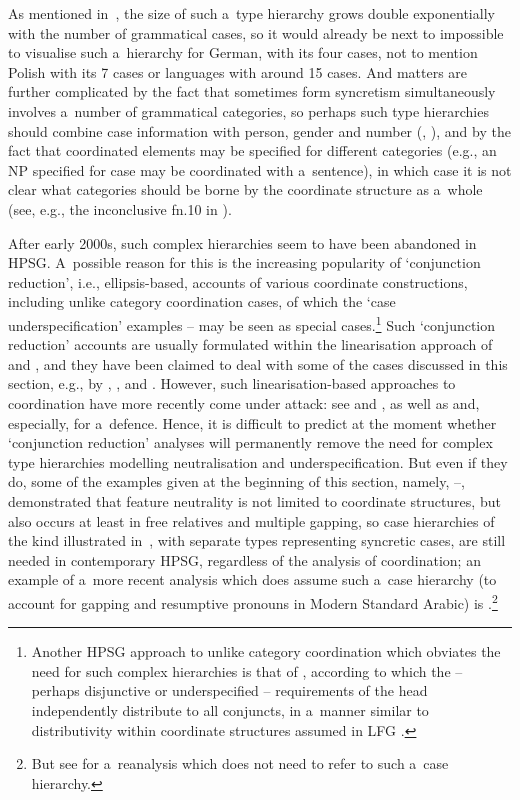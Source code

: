 \documentclass[output=paper]{langsci/langscibook}
\begin{document}
\z
As mentioned in~\citealt[225]{lev:pol:01}, the size of such a~type hierarchy grows double exponentially with the number of grammatical cases, so it would already be next to impossible to visualise such a~hierarchy for German, with its four cases, not to mention Polish with its 7 cases or  languages with around 15 cases.  And matters are further complicated by the fact that sometimes form syncretism simultaneously involves a~number of grammatical categories, so perhaps such type hierarchies should combine case information with person, gender and number (\citealt[145]{dani:01}, \citealt{Crysmann2005c}), and by the fact that coordinated elements may be specified for different categories (e.g., an NP specified for case may be coordinated with a~sentence), in which case it is not clear what categories should be borne by the coordinate structure as a~whole (see, e.g., the inconclusive fn.10 in \citealt[277]{sag:02}).

After early 2000s, such complex  hierarchies seem to have been abandoned in HPSG\@.  A~possible reason for this is the increasing popularity of `conjunction reduction’, i.e., ellipsis-based, accounts of various coordinate constructions, including unlike category coordination cases, of which the `case underspecification’ examples – may be seen as special cases.\footnote{Another HPSG approach to unlike category coordination which obviates the need for such complex hierarchies is that of \citealt{yata:04}, according to which the – perhaps disjunctive or underspecified – requirements of the head independently distribute to all conjuncts, in a~manner similar to distributivity within coordinate structures assumed in LFG \citep{DK2000a,dal:kin:sad:09,prz:pat:12a}.}  Such `conjunction reduction’ accounts are usually formulated within the linearisation approach of \citealt{Reape92a,Reape94a} and \citealt{Kathol95a}, and they have been claimed to deal with some of the cases discussed in this section, e.g., by \citealt{Crysmann2003c}, \citealt{BS2004a}, and \citealt{chav:06,chav:08}.  However, such linearisation-based approaches to coordination have more recently come under attack: see \citealt{levi:11} and \citealt{kub:lev:15}, as well as \citealt{yata:12,yata:16} and, especially, \citealt{yat:wai:18} for a~defence.  Hence, it is difficult to predict at the moment whether `conjunction reduction’ analyses will permanently remove the need for complex type hierarchies modelling neutralisation and underspecification.  But even if they do, some of the examples given at the beginning of this section, namely, –, demonstrated that feature neutrality is not limited to coordinate structures, but also occurs at least in free relatives and multiple gapping, so case hierarchies of the kind illustrated in~, with separate types representing syncretic cases, are still needed in contemporary HPSG, regardless of the analysis of coordination; an example of a~more recent analysis which does assume such a~case hierarchy (to account for gapping and resumptive pronouns in Modern Standard Arabic) is \citealt{AB2013a-u}.\footnote{But see \citealt{crys:17} for a~reanalysis which does not need to refer to such a~case hierarchy.}
\end{document}
